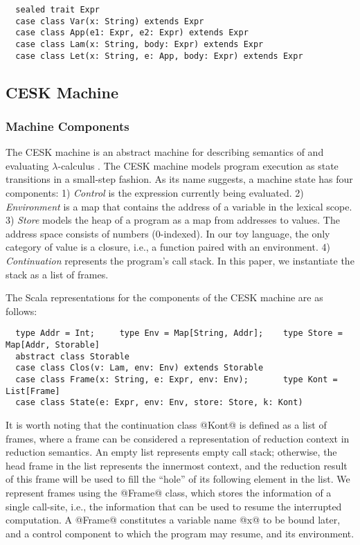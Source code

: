 \documentclass[acmsmall, review]{acmart}\settopmatter{}
\begin{document}
\begin{lstlisting}
  sealed trait Expr
  case class Var(x: String) extends Expr
  case class App(e1: Expr, e2: Expr) extends Expr
  case class Lam(x: String, body: Expr) extends Expr
  case class Let(x: String, e: App, body: Expr) extends Expr
\end{lstlisting}

\subsection{CESK Machine} \label{cesk}

\subsubsection{Machine Components}

The CESK machine is an abstract machine for describing semantics of and evaluating
$\lambda$-calculus \cite{felleisen1987calculus}. The CESK machine models program execution
as state transitions in a small-step fashion. As its name suggests, a machine state has
four components:
1) \textit{Control} is the expression currently being evaluated.
2) \textit{Environment} is a map that contains the address of a variable in the lexical scope.
3) \textit{Store} models the heap of a program as a map from addresses to values.
  The address space consists of numbers (0-indexed).
  In our toy language, the only category of value is a closure, i.e., a function paired with
  an environment.
4) \textit{Continuation} represents the program's call stack. In this paper, we instantiate the 
stack as a list of frames. 

The Scala representations for the components of the CESK machine are as follows:

\begin{lstlisting}
  type Addr = Int;     type Env = Map[String, Addr];    type Store = Map[Addr, Storable]
  abstract class Storable
  case class Clos(v: Lam, env: Env) extends Storable
  case class Frame(x: String, e: Expr, env: Env);       type Kont = List[Frame]
  case class State(e: Expr, env: Env, store: Store, k: Kont)
\end{lstlisting}

It is worth noting that the continuation class @Kont@ is defined as a list of
frames, where a frame can be considered a representation of reduction context 
in reduction semantics.
An empty list represents empty call stack; otherwise, the head frame in the list
represents the innermost context, and the reduction result of this frame will be used
to fill the ``hole'' of its following element in the list.
We represent frames using the @Frame@ class, which stores the information of a single
call-site, i.e., the information that can be used to resume the interrupted computation.
A @Frame@ constitutes a variable name @x@ to be bound later, and a control component
to which the program may resume, and its environment.
\end{document}
